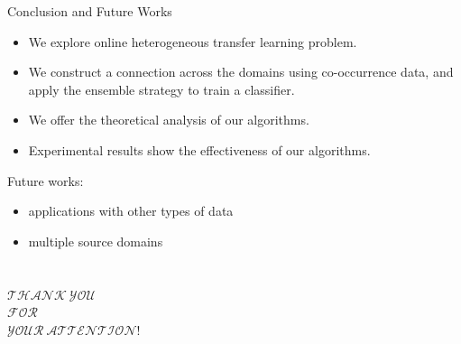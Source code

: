 \documentclass{beamer}
\begin{document}
\begin{frame}{Conclusion and Future Works}
\begin{itemize}
\item
We explore online heterogeneous transfer learning problem.
\item
We construct a connection across the domains using co-occurrence data, and apply the ensemble strategy to train a classifier.
\item
We offer the theoretical analysis of our algorithms.
\item
Experimental results show the effectiveness of our algorithms.
\end{itemize}
Future works:
\begin{itemize}
\item
applications with other types of data
\item
multiple source domains
\end{itemize}
\end{frame}

%
%

\section{}
\begin{frame}{}{}
\begin{center}
\begin{Huge}
$ \mathcal{THANK \ YOU}$ \\
$ \mathcal{FOR} $ \\
$ \mathcal{YOUR \ ATTENTION!}$ \\
\end{Huge}
\end{center}
\end{frame}
\end{document}
